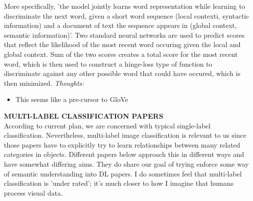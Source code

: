 \documentclass{report}
\begin{document}
More specifically, 'the model jointly learns word representation while learning to discriminate the next word, given a short word sequence (local contexti, syntactic information) and a document of text the sequence appears in (global context, semantic information)'. Two standard neural networks are used to predict scores that reflect the likelihood of the most recent word occuring given the local and global context. Sum of the two scores creates a total score for the most recent word, which is then used to construct a hinge-loss type of function to discriminate against any other possible word that could have occured, which is then minimized.
\textit{Thoughts:}
\begin{itemize}
    \item This seems like a pre-cursor to GloVe
\end{itemize}

\newpage

\textbf{MULTI-LABEL CLASSIFICATION PAPERS} \\
According to current plan, we are concerned with typical single-label classification. Nevertheless, multi-label image classification is relevant to us since those papers have to explicitly try to learn relationships between many related categories in objects. Different papers below approach this in different ways and have somewhat differing aims. They do share our goal of trying enforce some way of semantic understanding into DL papers. I do sometimes feel that multi-label classification is 'under rated'; it's much closer to how I imagine that humans process visual data. \\
\end{document}
